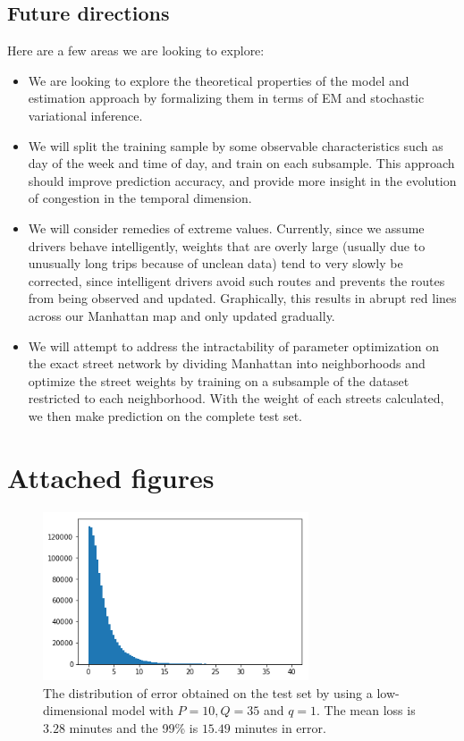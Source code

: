 \documentclass[11pt]{article}
\begin{document}
\subsection{Future directions}
Here are a few areas we are looking to explore:
\begin{itemize}
    \item We are looking to explore the theoretical properties of the model and estimation approach by formalizing them in terms of EM and stochastic variational inference.
    \item We will split the training sample by some observable characteristics such as day of the week and time of day, and train on each subsample. This approach should improve prediction accuracy, and provide more insight in the evolution of congestion in the temporal dimension.
    \item We will consider remedies of extreme values. Currently, since we assume drivers behave intelligently, weights that are overly large (usually due to unusually long trips because of unclean data) tend to very slowly be corrected, since intelligent drivers avoid such routes and prevents the routes from being observed and updated. Graphically, this results in abrupt red lines across our Manhattan map and only updated gradually.
    \item We will attempt to address the intractability of parameter optimization on the exact street network by dividing Manhattan into neighborhoods and optimize the street weights by training on a subsample of the dataset restricted to each neighborhood. With the weight of each streets calculated, we then make prediction on the complete test set.
\end{itemize}




\appendix
\section{Attached figures}

\begin{figure}[!h]
\centering
\includegraphics[width=0.7\textwidth]{error.png}
\caption{The distribution of error obtained on the test set by using a low-dimensional model with $P=10, Q = 35$ and $q=1$. The mean loss is $3.28$ minutes and the 99\% is $15.49$ minutes in error.}
\label{errs}
\end{figure}
\end{document}
